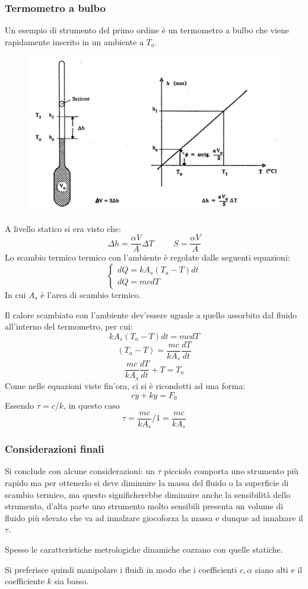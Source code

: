 \documentclass[a4paper, 15pt]{article}
\begin{document}
\subsubsection{Termometro a bulbo}	
\begin{adjustwidth}{2in}{}
	Un esempio di strumento del primo ordine è un termometro a bulbo che viene rapidamente inserito in un ambiente a $T_a$. 
	\begin{figure}[H]
		\centering
		\includegraphics[width=0.7\linewidth]{fig/imag3}
		\label{fig:imag3}
	\end{figure}	
	A livello statico si era visto che:
	\[ \Delta h = \dfrac{\alpha V}{A}\Delta T \hspace{1cm} S = \dfrac{\alpha V}{A} \]
	Lo scambio termico termico con l'ambiente è regolate dalle seguenti equazioni: 
	\[  \begin{cases}
		dQ = kA_s(T_a - T)dt \\
		dQ = mcdT 
	\end{cases}\]
	In cui $A_s$ è l'area di scambio termico. 
	
	Il calore scambiato con l'ambiente dev'essere uguale a quello assorbito dal fluido all'interno del termometro, per cui:
	\[ kA_s(T_a - T)dt = mcdT \]
	\[ (T_a - T) = \dfrac{mc}{kA_s}\dfrac{dT}{dt}\]
	\[ \dfrac{mc}{kA_s}\dfrac{dT}{dt} + T = T_a  \]
	Come nelle equazioni viste fin'ora, ci si è ricondotti ad una forma:
	\[ c\dot{y} + ky = F_0\]
	Essendo $ \tau = c/k $, in questo caso 
	\[\tau = \dfrac{mc}{kA_s}/1 = \dfrac{mc}{kA_s}\]
\end{adjustwidth}
\subsubsection{Considerazioni finali}	
\begin{adjustwidth}{2in}{}	
	Si conclude con alcune considerazioni: un $\tau$ picciolo comporta uno strumento più rapido ma per ottenerlo si deve diminuire la massa del fluido o la superficie di scambio termico, ma questo significherebbe diminuire anche la sensibilità dello strumento, d'alta parte uno strumento molto sensibili presenta un volume di fluido più elevato che va ad innalzare giocoforza la massa e dunque ad innalzare il $\tau$. 
	
	Spesso le caratteristiche metrologiche dinamiche cozzano con quelle statiche. \newline 
	
	Si preferisce quindi manipolare i fluidi in modo che i coefficienti $c, \alpha$ siano alti e il coefficiente $k$ sia basso.  
\end{adjustwidth}
\newpage
\end{document}
